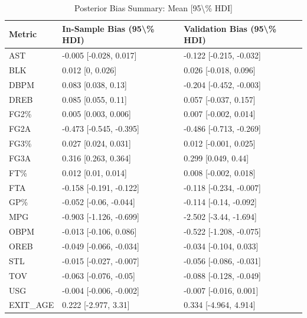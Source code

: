 \begin{table}[t]
\caption*{
{\fontsize{20}{25}\selectfont  Posterior Bias Summary: Mean [95\textbackslash{}\% HDI]\fontsize{12}{15}\selectfont }
} 
\fontsize{12.0pt}{14.0pt}\selectfont
\begin{tabular*}{\linewidth}{@{\extracolsep{\fill}}lll}
\toprule
Metric & In-Sample Bias (95\textbackslash{}\% HDI) & Validation Bias (95\textbackslash{}\% HDI) \\ 
\midrule\addlinespace[2.5pt]
AST & -0.005 [-0.028, 0.017] & -0.122 [-0.215, -0.032] \\ 
BLK & 0.012 [0, 0.026] & 0.026 [-0.018, 0.096] \\ 
DBPM & 0.083 [0.038, 0.13] & -0.204 [-0.452, -0.003] \\ 
DREB & 0.085 [0.055, 0.11] & 0.057 [-0.037, 0.157] \\ 
FG2\% & 0.005 [0.003, 0.006] & 0.007 [-0.002, 0.014] \\ 
FG2A & -0.473 [-0.545, -0.395] & -0.486 [-0.713, -0.269] \\ 
FG3\% & 0.027 [0.024, 0.031] & 0.012 [-0.001, 0.025] \\ 
FG3A & 0.316 [0.263, 0.364] & 0.299 [0.049, 0.44] \\ 
FT\% & 0.012 [0.01, 0.014] & 0.008 [-0.002, 0.018] \\ 
FTA & -0.158 [-0.191, -0.122] & -0.118 [-0.234, -0.007] \\ 
GP\% & -0.052 [-0.06, -0.044] & -0.114 [-0.14, -0.092] \\ 
MPG & -0.903 [-1.126, -0.699] & -2.502 [-3.44, -1.694] \\ 
OBPM & -0.013 [-0.106, 0.086] & -0.522 [-1.208, -0.075] \\ 
OREB & -0.049 [-0.066, -0.034] & -0.034 [-0.104, 0.033] \\ 
STL & -0.015 [-0.027, -0.007] & -0.056 [-0.086, -0.031] \\ 
TOV & -0.063 [-0.076, -0.05] & -0.088 [-0.128, -0.049] \\ 
USG & -0.004 [-0.006, -0.002] & -0.007 [-0.016, 0.001] \\ 
EXIT\_AGE & 0.222 [-2.977, 3.31] & 0.334 [-4.964, 4.914] \\ 
\bottomrule
\end{tabular*}
\end{table}

